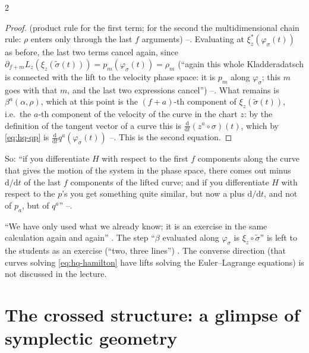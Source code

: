 \begin{paracol}{2}
\begin{proof}
(product rule for the first term; for the second the multidimensional chain rule: $\rho$ enters only through the last $f$ arguments) --. Evaluating at $\xi^*_z(\varphi_\sigma(t))$ as before, the last two terms cancel again, since $\partial_{f+m}L_z(\xi_z(\tilde\sigma(t)))=p_m(\varphi_\sigma(t))=\rho_m$ (``again this whole Kladderadatsch is connected with the lift to the velocity phase space: it is $p_m$ along $\varphi_\sigma$; this $m$ goes with that $m$, and the last two expressions cancel'') --. What remains is $\beta^a(\alpha,\rho)$, which at this point is the $(f+a)$-th component of $\xi_z(\tilde\sigma(t))$, i.e.\ the $a$-th component of the velocity of the curve in the chart $z$: by the definition of the tangent vector of a curve this is $\frac{\mathrm d}{\mathrm dt}(z^a\circ\sigma)(t)$, which by \eqref{eq:hq-qp} is $\frac{\mathrm d}{\mathrm dt}q^a(\varphi_\sigma(t))$ --. This is the second equation. \qedhere
\end{proof}
So: ``if you differentiate $H$ with respect to the first $f$ components along the curve that gives the motion of the system in the phase space, there comes out minus $\mathrm d/\mathrm dt$ of the last $f$ components of the lifted curve; and if you differentiate $H$ with respect to the $p$'s you get something quite similar, but now a plus $\mathrm d/\mathrm dt$, and not of $p_a$, but of $q^a$'' --.

\begin{coursenote}\label{cn:hq-exercise}
``We have only used what we already know; it is an exercise in the same calculation again and again'' . The step ``$\beta$ evaluated along $\varphi_\sigma$ is $\xi_z\circ\tilde\sigma$'' is left to the students as an exercise (``two, three lines'') . The converse direction (that curves solving \eqref{eq:hq-hamilton} have lifts solving the Euler--Lagrange equations) is not discussed in the lecture.
\end{coursenote}

\section{The crossed structure: a glimpse of symplectic geometry}\label{sec:hq-symplectic}


\end{paracol}

